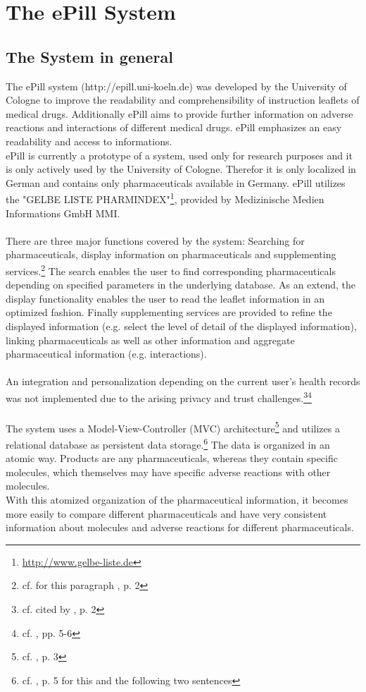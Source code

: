 \section{The ePill System}

\subsection{The System in general}
The ePill system (http://epill.uni-koeln.de) was developed by the University of Cologne to improve the readability and comprehensibility of instruction leaflets of medical drugs. Additionally ePill aims to provide further information on adverse reactions and interactions of different medical drugs. ePill emphasizes an easy readability and access to informations.
\\
ePill is currently a prototype of a system, used only for research purposes and it is only actively used by the University of Cologne. Therefor it is only localized in German and contains only pharmaceuticals available in Germany. ePill utilizes the "GELBE LISTE PHARMINDEX"\footnote{\url{http://www.gelbe-liste.de}}, provided by Medizinische Medien Informations GmbH MMI.
\\
\\
There are three major functions covered by the system: Searching for pharmaceuticals, display information on pharmaceuticals and supplementing services.\footnote{cf. for this paragraph \cite{Dehling.2012}, p. 2} The search enables the user to find corresponding pharmaceuticals depending on specified parameters in the underlying database. As an extend, the display functionality enables the user to read the leaflet information in an optimized fashion. Finally supplementing services are provided to refine the displayed information (e.g. select the level of detail of the displayed information), linking pharmaceuticals as well as other information and aggregate pharmaceutical information (e.g. interactions).
\\
\\
An integration and personalization depending on the current user's health records was not implemented due to the arising privacy and trust challenges.\footnote{cf. \cite{Kaletsch.2011} cited by \cite{Dehling.2012}, p. 2}\footnote{cf. \cite{Kaletsch.2011}, pp. 5-6}
\\
\\
The system uses a Model-View-Controller (MVC) architecture\footnote{cf. \cite{Dehling.2012}, p. 3} and utilizes a relational database  as persistent data storage.\footnote{cf. \cite{Dehling.2012}, p. 5 for this and the following two sentences} The data is organized in an atomic way. Products are any pharmaceuticals, whereas they contain specific molecules, which themselves may have specific adverse reactions with other molecules. 
\\
With this atomized organization of the pharmaceutical information, it becomes more easily to compare different pharmaceuticals and have very consistent information about molecules and adverse reactions for different pharmaceuticals.

